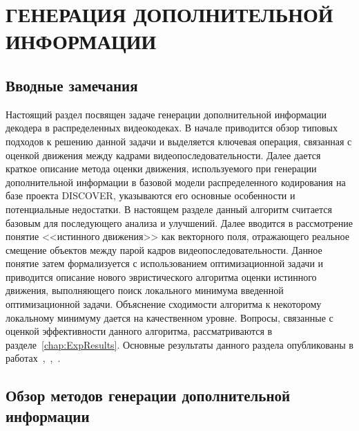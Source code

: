 \chapter{ГЕНЕРАЦИЯ ДОПОЛНИТЕЛЬНОЙ ИНФОРМАЦИИ}
\label{chap:SIG}

\section{Вводные замечания}
\label{chap:SIG:Intro}

Настоящий раздел посвящен задаче генерации дополнительной информации декодера в распределенных видеокодеках. В начале приводится обзор типовых подходов к решению данной задачи и выделяется ключевая операция, связанная с оценкой движения между кадрами видеопоследовательности. Далее дается краткое описание метода оценки движения, используемого при генерации дополнительной информации в базовой модели распределенного кодирования на базе проекта DISCOVER, указываются его основные особенности и потенциальные недостатки. В настоящем разделе данный алгоритм считается базовым для последующего анализа и улучшений. Далее вводится в рассмотрение понятие <<истинного движения>> как векторного поля, отражающего реальное смещение объектов между парой кадров видеопоследовательности. Данное понятие затем формализуется с использованием оптимизационной задачи и приводится описание нового эвристического алгоритма оценки истинного движения, выполняющего поиск локального минимума введенной оптимизационной задачи. Объяснение сходимости алгоритма к некоторому локальному минимуму дается на качественном уровне. Вопросы, связанные с оценкой эффективности данного алгоритма, рассматриваются в разделе~\ref{chap:ExpResults}. Основные результаты данного раздела опубликованы в работах~\cite{VeselovMonograph},~\cite{6958822},~\cite{VeselovIus}.

\section{Обзор методов генерации дополнительной информации}
\label{chap:SIG:Review}

